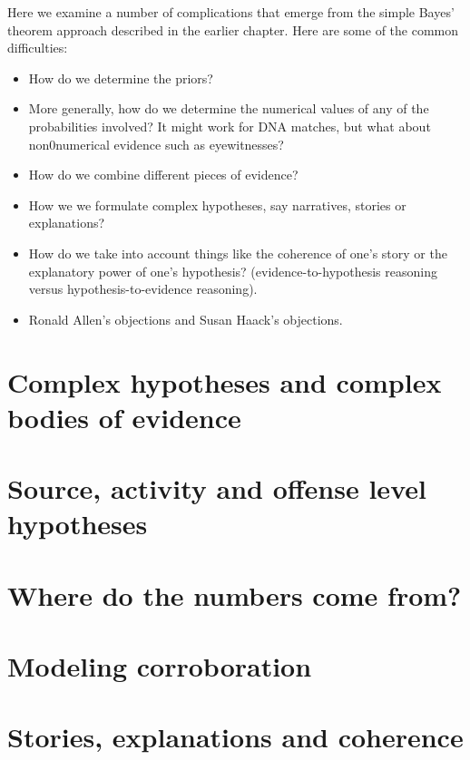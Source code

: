 \documentclass[]{book}
\begin{document}
Here we examine a number of complications that
emerge from the simple Bayes' theorem approach
described in the earlier chapter. Here are some of the common difficulties:

\begin{itemize}
 
 \item How do we determine the priors?
 
 \item More generally, how do we determine the numerical 
 values of any of the probabilities involved? 
 It might work for DNA matches, but what about non0numerical evidence 
 such as eyewitnesses? 
 
 \item How do we combine different pieces of evidence?  
 
 \item How we we formulate complex hypotheses, 
 say narratives, stories or explanations? 
 
 \item How do we take into account things 
 like the coherence of one's story or 
 the explanatory power of one's hypothesis?
 (evidence-to-hypothesis reasoning 
 versus hypothesis-to-evidence reasoning).
 
 \item Ronald Allen's objections 
 and Susan Haack's objections. 
 
 \end{itemize}

\section{Complex hypotheses and complex bodies of evidence}

\section{Source, activity and offense level hypotheses}

\section{Where do the numbers come from?}

\section{Modeling corroboration}

\section{Stories, explanations and coherence}
\end{document}
